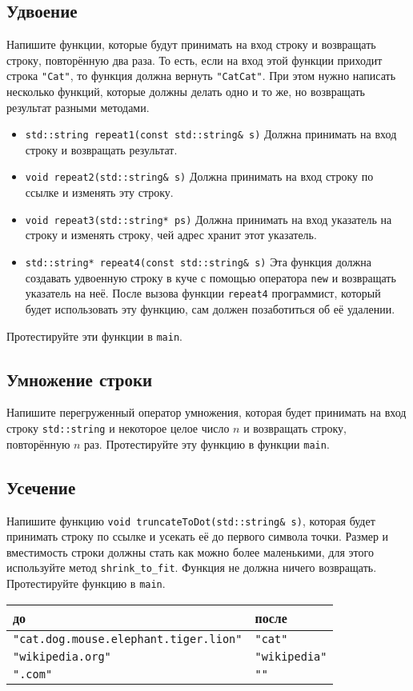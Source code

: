\documentclass{article}
\begin{document}
\subsection{Удвоение}
Напишите функции, которые будут принимать на вход строку и возвращать строку, повторённую два раза. То есть, если на вход этой функции приходит строка \texttt{"Cat"}, то функция должна вернуть \texttt{"CatCat"}.
При этом нужно написать несколько функций, которые должны делать одно и то же, но возвращать результат разными методами.
\begin{itemize}
\item \texttt{std::string repeat1(const std::string\& s)}
Должна принимать на вход строку и возвращать результат.
\item \texttt{void repeat2(std::string\& s)}
Должна принимать на вход строку по ссылке и изменять эту строку.
\item \texttt{void repeat3(std::string* ps)}
Должна принимать на вход указатель на строку и изменять строку, чей адрес хранит этот указатель.
\item \texttt{std::string* repeat4(const std::string\& s)}
Эта функция должна создавать удвоенную строку в куче с помощью оператора \texttt{new} и возвращать указатель на неё. После вызова функции \texttt{repeat4} программист, который будет использовать эту функцию, сам должен позаботиться об её удалении.
\end{itemize}

Протестируйте эти функции в \texttt{main}.

\subsection{Умножение строки}
Напишите перегруженный оператор умножения, которая будет принимать на вход строку \texttt{std::string} и некоторое целое число $n$ и возвращать строку, повторённую $n$ раз. Протестируйте эту функцию в функции \texttt{main}.


\subsection{Усечение}
Напишите функцию \texttt{void truncateToDot(std::string\& s)}, которая будет принимать строку по ссылке и усекать её до первого символа точки. Размер и вместимость строки должны стать как можно более маленькими, для этого используйте метод \texttt{shrink\_to\_fit}. Функция не должна ничего возвращать. Протестируйте функцию в \texttt{main}.
\begin{center}
\begin{tabular}{ l | l }
 до & после \\ \hline
 \texttt{"cat.dog.mouse.elephant.tiger.lion"} & \texttt{"cat"} \\
 \texttt{"wikipedia.org"} & \texttt{"wikipedia"}  \\ 
 \texttt{".com"} & \texttt{"{}"} \\
\end{tabular}
\end{center}
\end{document}

